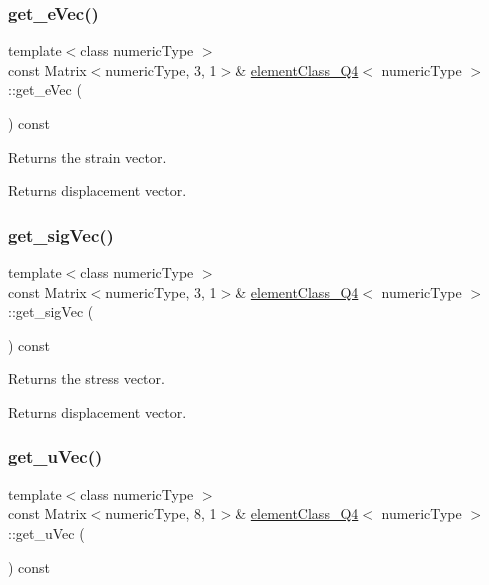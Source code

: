 \subsubsection{\texorpdfstring{get\+\_\+e\+Vec()}{get\_eVec()}}
{\footnotesize\ttfamily template$<$class numeric\+Type $>$ \\
const Matrix$<$numeric\+Type, 3, 1$>$\& \mbox{\hyperlink{classelement_class___q4}{element\+Class\+\_\+\+Q4}}$<$ numeric\+Type $>$\+::get\+\_\+e\+Vec (\begin{DoxyParamCaption}{ }\end{DoxyParamCaption}) const\hspace{0.3cm}{\ttfamily [inline]}}

Returns the strain vector. \begin{DoxyReturn}{Returns}
displacement vector. 
\end{DoxyReturn}
\mbox{\label{classelement_class___q4_ac170a307dec6500c8af43d45eb2589ff}} 
\subsubsection{\texorpdfstring{get\+\_\+sig\+Vec()}{get\_sigVec()}}
{\footnotesize\ttfamily template$<$class numeric\+Type $>$ \\
const Matrix$<$numeric\+Type, 3, 1$>$\& \mbox{\hyperlink{classelement_class___q4}{element\+Class\+\_\+\+Q4}}$<$ numeric\+Type $>$\+::get\+\_\+sig\+Vec (\begin{DoxyParamCaption}{ }\end{DoxyParamCaption}) const\hspace{0.3cm}{\ttfamily [inline]}}

Returns the stress vector. \begin{DoxyReturn}{Returns}
displacement vector. 
\end{DoxyReturn}
\mbox{\label{classelement_class___q4_a70653030dc6fd2a1032e1056d3e856e1}} 
\subsubsection{\texorpdfstring{get\+\_\+u\+Vec()}{get\_uVec()}}
{\footnotesize\ttfamily template$<$class numeric\+Type $>$ \\
const Matrix$<$numeric\+Type, 8, 1$>$\& \mbox{\hyperlink{classelement_class___q4}{element\+Class\+\_\+\+Q4}}$<$ numeric\+Type $>$\+::get\+\_\+u\+Vec (\begin{DoxyParamCaption}{ }\end{DoxyParamCaption}) const\hspace{0.3cm}{\ttfamily [inline]}}

